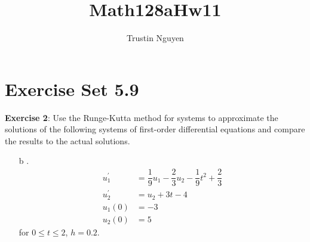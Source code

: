 \documentclass{article}
\title{Math128aHw11}
\author{Trustin Nguyen}
\begin{document}
    \maketitle

\reversemarginpar

\section*{Exercise Set 5.9}

\textbf{Exercise 2}: Use the Runge-Kutta method for systems to approximate the solutions of the following systems of first-order differential equations and compare the results to the actual solutions.
    \begin{itemize}
        \item [b]. 
            \begin{align*}
                u_{1}^{\prime} &= \dfrac{1}{9}u_{1} - \dfrac{2}{3}u_{2} - \dfrac{1}{9}t^{2} + \dfrac{2}{3} \\
                u_{2}^{\prime} &= u_{2} + 3t - 4                                                           \\
                u_{1}(0)       &= -3                                                                       \\
                u_{2}(0)       &= 5                                                                          
            \end{align*}
        for $0 \leq t \leq 2$, $h = 0.2$.
    \end{itemize}
\end{document}
